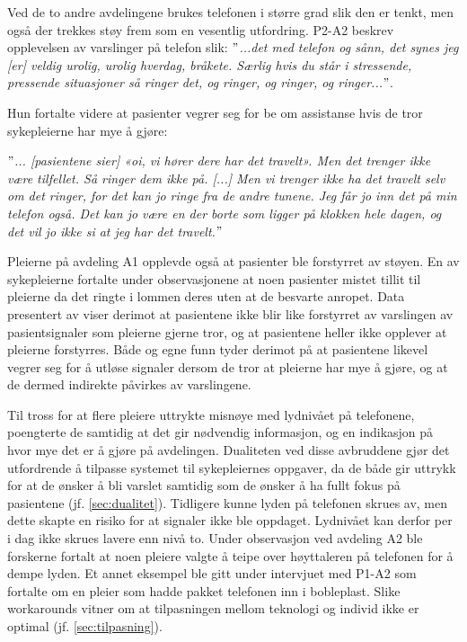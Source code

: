 \noindent
Ved de to andre avdelingene brukes telefonen i større grad slik den er tenkt, men også der trekkes støy frem som en vesentlig utfordring. P2-A2 beskrev opplevelsen av varslinger på telefon slik: \textit{ $"$...det med telefon og sånn, det synes jeg [er] veldig urolig, urolig hverdag, bråkete. Særlig hvis du står i stressende, pressende situasjoner så ringer det, og ringer, og ringer, og ringer...$"$}. 

\noindent
Hun fortalte videre at pasienter vegrer seg for be om assistanse hvis de tror sykepleierne har mye å gjøre:

\noindent
\textit{$"$... [pasientene sier] «oi, vi hører dere har det travelt». Men det trenger ikke være tilfellet. Så ringer dem ikke på. [...] Men vi trenger ikke ha det travelt selv om det ringer, for det kan jo ringe fra de andre tunene. Jeg får jo inn det på min telefon også. Det kan jo være en der borte som ligger på klokken hele dagen, og det vil jo ikke si at jeg har det travelt.$"$}

\noindent
Pleierne på avdeling A1 opplevde også at pasienter ble forstyrret av støyen. En av sykepleierne fortalte under observasjonene at noen pasienter mistet tillit til pleierne da det ringte i lommen deres uten at de besvarte anropet. Data presentert av \citet{Rygh13} viser derimot at pasientene ikke blir like forstyrret av varslingen av pasientsignaler som pleierne gjerne tror, og at pasientene heller ikke opplever at pleierne forstyrres. Både \citet{Rygh13} og egne funn tyder derimot på at pasientene likevel vegrer seg for å utløse signaler dersom de tror at pleierne har mye å gjøre, og at de dermed indirekte påvirkes av varslingene.

\noindent
Til tross for at flere pleiere uttrykte misnøye med lydnivået på telefonene, poengterte de samtidig at det gir nødvendig informasjon, og en indikasjon på hvor mye det er å gjøre på avdelingen. Dualiteten ved disse avbruddene gjør det utfordrende å tilpasse systemet til sykepleiernes oppgaver, da de både gir uttrykk for at de ønsker å bli varslet samtidig som de ønsker å ha fullt fokus på pasientene (jf. \ref{sec:dualitet}). Tidligere kunne lyden på telefonen skrues av, men dette skapte en risiko for at signaler ikke ble oppdaget. Lydnivået kan derfor per i dag ikke skrues lavere enn nivå to. Under observasjon ved avdeling A2 ble forskerne fortalt at noen pleiere valgte å teipe over høyttaleren på telefonen for å dempe lyden. Et annet eksempel ble gitt under intervjuet med P1-A2 som fortalte om en pleier som hadde pakket telefonen inn i bobleplast. Slike workarounds vitner om at tilpasningen mellom teknologi og individ ikke er optimal (jf. \ref{sec:tilpasning}).

